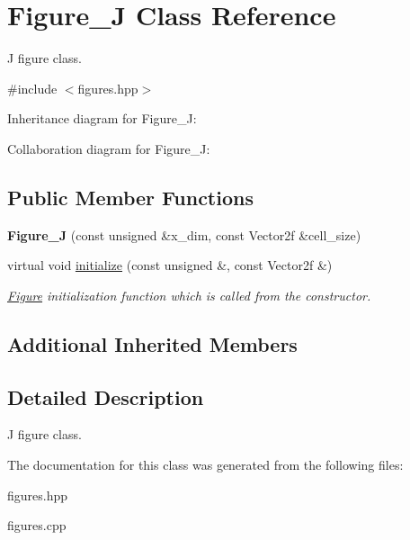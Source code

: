 \hypertarget{classFigure__J}{}\section{Figure\+\_\+J Class Reference}
\label{classFigure__J}


J figure class.  




{\ttfamily \#include $<$figures.\+hpp$>$}



Inheritance diagram for Figure\+\_\+J\+:


Collaboration diagram for Figure\+\_\+J\+:
\subsection*{Public Member Functions}
\begin{DoxyCompactItemize}
\item 
\mbox{\label{classFigure__J_a7a0327f61029ad3185c9d18a821f2fed}} 
{\bfseries Figure\+\_\+J} (const unsigned \&x\+\_\+dim, const Vector2f \&cell\+\_\+size)
\item 
\mbox{\label{classFigure__J_a1782bdf5c067974bae72561556da7a86}} 
virtual void \hyperlink{classFigure__J_a1782bdf5c067974bae72561556da7a86}{initialize} (const unsigned \&, const Vector2f \&)
\begin{DoxyCompactList}\small\item\em \hyperlink{classFigure}{Figure} initialization function which is called from the constructor. \end{DoxyCompactList}\end{DoxyCompactItemize}
\subsection*{Additional Inherited Members}


\subsection{Detailed Description}
J figure class. 

The documentation for this class was generated from the following files\+:\begin{DoxyCompactItemize}
\item 
figures.\+hpp\item 
figures.\+cpp\end{DoxyCompactItemize}

